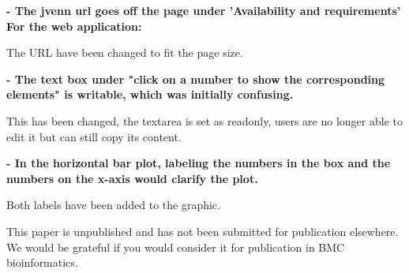 \documentclass[10pt,stdletter,dateno,sigleft]{newlfm} %
\begin{document}
\begin{newlfm}
\textbf{- The jvenn url goes off the page under 'Availability and requirements'
For the web application:}

The URL have been changed to fit the page size. 

\textbf{- The text box under "click on a number to show the corresponding
elements" is writable, which was initially confusing.}

This has been changed, the textarea is set as readonly, users are no longer able 
to edit it but can still copy its content.

\textbf{- In the horizontal bar plot, labeling the numbers in the box and the
numbers on the x-axis would clarify the plot.}

Both labels have been added to the graphic.


This paper is unpublished and has not been submitted for publication elsewhere. 
We would be grateful if you would consider it for publication in BMC 
bioinformatics.


\end{newlfm}
\end{document}
